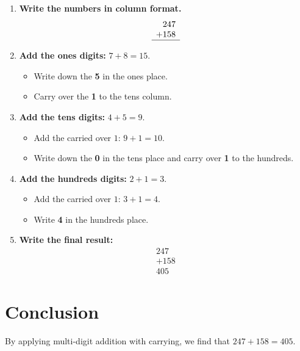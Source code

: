 \documentclass{article}
\begin{document}
\begin{enumerate}[label=Step \arabic*:, leftmargin=*]
    \item \textbf{Write the numbers in column format.}
          \[
              \begin{array}{r}
                  247  \\
                  +158 \\
                  \hline
              \end{array}
          \]

    \item \textbf{Add the ones digits:} $7 + 8 = 15$.

          \begin{itemize}
              \item Write down the \textbf{5} in the ones place.
              \item Carry over the \textbf{1} to the tens column.
          \end{itemize}

    \item \textbf{Add the tens digits:} $4 + 5 = 9$.

          \begin{itemize}
              \item Add the carried over $1$: $9 + 1 = 10$.
              \item Write down the \textbf{0} in the tens place and carry over \textbf{1} to the hundreds.
          \end{itemize}

    \item \textbf{Add the hundreds digits:} $2 + 1 = 3$.

          \begin{itemize}
              \item Add the carried over $1$: $3 + 1 = 4$.
              \item Write \textbf{4} in the hundreds place.
          \end{itemize}

    \item \textbf{Write the final result:}
          \[
              \begin{array}{r}
                  247  \\
                  +158 \\
                  \hline
                  405
              \end{array}
          \]
\end{enumerate}

\section*{Conclusion}
By applying multi-digit addition with carrying, we find that $247 + 158 = 405$.
\end{document}
